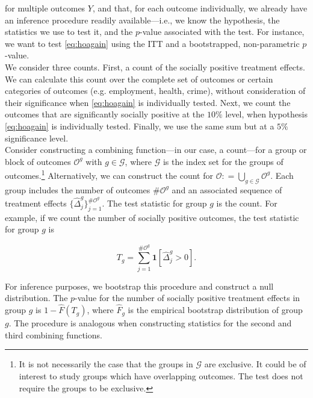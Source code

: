 \noindent for multiple outcomes $Y$, and that, for each outcome individually, we already have an inference procedure readily available---i.e., we know the hypothesis, the statistics we use to test it, and the $p$-value associated with the test. For instance, we want to test \eqref{eq:hoagain} using the ITT and a bootstrapped, non-parametric $p$-value.\\

\noindent We consider three counts. First, a count of the socially positive treatment effects. We can calculate this count over the complete set of outcomes or certain categories of outcomes (e.g. employment, health, crime), without consideration of their significance when \eqref{eq:hoagain} is individually tested. Next, we count the outcomes that are significantly socially positive at the $10\%$ level, when hypothesis \eqref{eq:hoagain} is individually tested. Finally, we use the same sum but at a $5\%$ significance level.\\

\noindent Consider constructing a combining function---in our case, a count---for a group or block of outcomes $\mathcal{O}^g$ with $g \in \mathcal{G}$, where $\mathcal{G}$ is the index set for the groups of outcomes.\footnote{It is not necessarily the case that the groups in $\mathcal{G}$ are exclusive. It could be of interest to study groups which have overlapping outcomes. The test does not require the groups to be exclusive.} Alternatively, we can construct the count for $\mathcal{O} : =  \bigcup \limits _{g \in \mathcal{G}} \mathcal{O}^g$. Each group includes the number of outcomes $\# \mathcal{O}^g$ and an associated sequence of treatment effects $\{ \widehat{\Delta}_{j}^{g} \}_{j = 1}^{\# \mathcal{O}^g}$. The test statistic for group $g$ is the count. For example, if we count the number of socially positive outcomes, the test statistic for group $g$ is 

\begin{equation}
T_{g} = \sum _{j=1}^{\# \mathcal{O}^g} \mathbf{1} \left[ \widehat{\Delta}_{j}^{g} > 0\right]. 
\end{equation} 

\noindent For inference purposes, we bootstrap this procedure and construct a null distribution. The $p$-value for the number of socially positive treatment effects in group $g$ is $1 - \widehat{F} \left( T_{g} \right)$, where $ \widehat{F}_{g}$ is the empirical bootstrap distribution of group $g$. The procedure is analogous when constructing statistics for the second and third combining functions.\\

